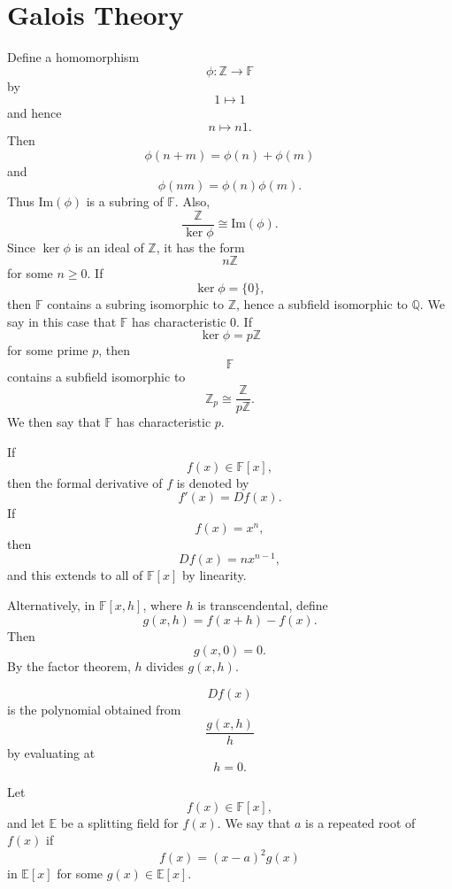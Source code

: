 
\section{Galois Theory}

Define a homomorphism
\[
    \phi:\mathbb{Z}\to \mathbb{F}
\]
by
\[
    1\mapsto 1
\]
and hence
\[
    n\mapsto n1.
\]
Then
\[
    \phi(n+m)=\phi(n)+\phi(m)
\]
and
\[
    \phi(nm)=\phi(n)\phi(m).
\]
Thus $\mathrm{Im}(\phi)$ is a subring of $\mathbb{F}$.
Also,
\[
    \frac{\mathbb{Z}}{\ker\phi}\cong \mathrm{Im}(\phi).
\]
Since $\ker\phi$ is an ideal of $\mathbb{Z}$, it has the form
\[
    n\mathbb{Z}
\]
for some $n\geq 0$.
If
\[
    \ker\phi=\{0\},
\]
then $\mathbb{F}$ contains a subring isomorphic to $\mathbb{Z}$, hence a subfield isomorphic to $\mathbb{Q}$.
We say in this case that $\mathbb{F}$ has characteristic $0$.
If
\[
    \ker\phi=p\mathbb{Z}
\]
for some prime $p$, then
\[
    \mathbb{F}
\]
contains a subfield isomorphic to
\[
    \mathbb{Z}_p\cong \frac{\mathbb{Z}}{p\mathbb{Z}}.
\]
We then say that $\mathbb{F}$ has characteristic $p$.

\begin{definition}
    If
    \[
        f(x)\in \mathbb{F}[x],
    \]
    then the formal derivative of $f$ is denoted by
    \[
        f'(x)=Df(x).
    \]
    If
    \[
        f(x)=x^n,
    \]
    then
    \[
        Df(x)=nx^{n-1},
    \]
    and this extends to all of $\mathbb{F}[x]$ by linearity.
\end{definition}

Alternatively, in $\mathbb{F}[x,h]$, where $h$ is transcendental, define
\[
    g(x,h)=f(x+h)-f(x).
\]
Then
\[
    g(x,0)=0.
\]
By the factor theorem, $h$ divides $g(x,h)$.

\begin{definition}
    \[
        Df(x)
    \]
    is the polynomial obtained from
    \[
        \frac{g(x,h)}{h}
    \]
    by evaluating at
    \[
        h=0.
    \]
\end{definition}

\begin{definition}
    Let
    \[
        f(x)\in \mathbb{F}[x],
    \]
    and let $\mathbb{E}$ be a splitting field for $f(x)$.
    We say that $a$ is a repeated root of $f(x)$ if
    \[
        f(x)=(x-a)^{2}g(x)
    \]
    in $\mathbb{E}[x]$ for some $g(x)\in \mathbb{E}[x]$.
\end{definition}

